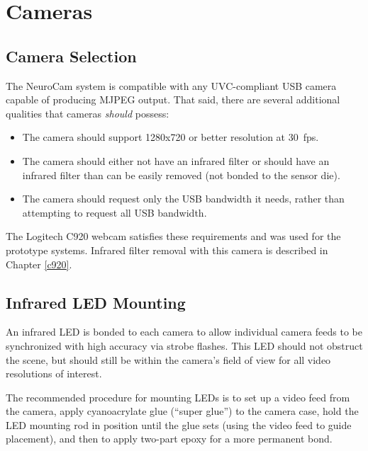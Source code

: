 
\chapter{Cameras}
\label{cameras}

\section*{Camera Selection}

The NeuroCam system is compatible with any UVC-compliant USB camera capable
of producing MJPEG output. That said, there are several additional qualities
that cameras \textit{should} possess:

\begin{itemize}
\item The camera should support 1280x720 or better resolution at 30~fps.
\item The camera should either not have an infrared filter or should have an
infrared filter than can be easily removed (not bonded to the sensor die).
\item The camera should request only the USB bandwidth it needs, rather than
attempting to request all USB bandwidth.
\end{itemize}

The Logitech C920 webcam satisfies these requirements and was used for the
prototype systems. Infrared filter removal with this camera is described in
Chapter \ref{c920}.

\section*{Infrared LED Mounting}

An infrared LED is bonded to each camera to allow individual camera feeds
to be synchronized with high accuracy via strobe flashes. This LED should
not obstruct the scene, but should still be within the camera's field of
view for all video resolutions of interest.

The recommended procedure for mounting LEDs is to set up a video feed from
the camera, apply cyanoacrylate glue (``super glue'') to the camera case,
hold the LED mounting rod in position until the glue sets (using the video
feed to guide placement), and then to apply two-part epoxy for a more
permanent bond.

